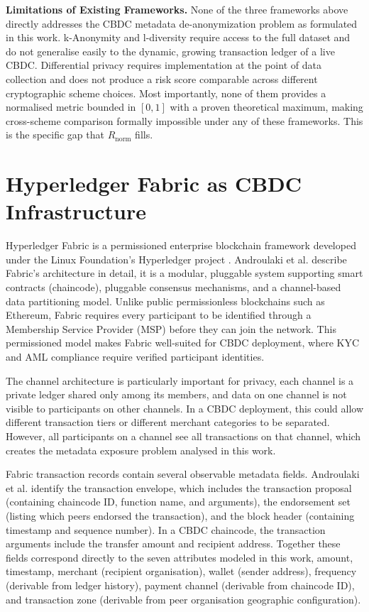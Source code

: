 \textbf{Limitations of Existing Frameworks.} None of the
three frameworks above directly addresses the CBDC metadata
de-anonymization problem as formulated in this work.
k-Anonymity and l-diversity require access to the full
dataset and do not generalise easily to the dynamic,
growing transaction ledger of a live CBDC. Differential
privacy requires implementation at the point of data
collection and does not produce a risk score comparable
across different cryptographic scheme choices. Most
importantly, none of them provides a normalised metric
bounded in $[0,1]$ with a proven theoretical maximum,
making cross-scheme comparison formally impossible under
any of these frameworks. This is the specific gap that
$R_{\mathrm{norm}}$ fills.

\section{Hyperledger Fabric as CBDC Infrastructure}
\label{sec:fabric}

Hyperledger Fabric is a permissioned enterprise blockchain
framework developed under the Linux Foundation's Hyperledger
project \cite{hyperledgerfabric2023}. Androulaki et al.
\cite{androulaki2018} describe Fabric's architecture in
detail, it is a modular, pluggable system supporting smart
contracts (chaincode), pluggable consensus mechanisms, and
a channel-based data partitioning model. Unlike public
permissionless blockchains such as Ethereum, Fabric requires
every participant to be identified through a Membership
Service Provider (MSP) before they can join the network.
This permissioned model makes Fabric well-suited for CBDC
deployment, where KYC and AML compliance require verified
participant identities.

The channel architecture is particularly important for
privacy, each channel is a private ledger shared only among
its members, and data on one channel is not visible to
participants on other channels. In a CBDC deployment, this
could allow different transaction tiers or different
merchant categories to be separated. However, all
participants on a channel see all transactions on that
channel, which creates the metadata exposure problem
analysed in this work.

Fabric transaction records contain several observable
metadata fields. Androulaki et al. \cite{androulaki2018}
identify the transaction envelope, which includes the
transaction proposal (containing chaincode ID, function
name, and arguments), the endorsement set (listing which
peers endorsed the transaction), and the block header
(containing timestamp and sequence number). In a CBDC
chaincode, the transaction arguments include the transfer
amount and recipient address. Together these fields correspond
directly to the seven attributes modeled in this work,
amount, timestamp, merchant (recipient organisation),
wallet (sender address), frequency (derivable from ledger
history), payment channel (derivable from chaincode ID),
and transaction zone (derivable from peer organisation
geographic configuration).

